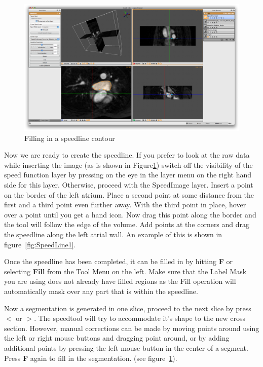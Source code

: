 \documentclass[fleqn,11pt,openany]{book}
\begin{document}
\begin{figure}
\includegraphics[width=\textwidth]{Seg3DTutorial_figures/SpeedlineFill.png}
\caption{Filling in a speedline contour}\label{fig:SpeedLine2}
\end{figure}

Now we are ready to create the speedline.  If you prefer to look at the raw data while inserting the image (as is shown in Figure\ref{fig:SpeedLine2}) switch off the visibility of the speed function layer by pressing on the eye in the layer menu on the right hand side for this layer.  Otherwise, proceed with the SpeedImage layer.  Insert a point on the border of the left atrium.  Place a second point at some distance from the first and a third point even further away. With the third point in place, hover over a point until you get a hand icon.  Now drag this point along the border and the tool will follow the edge of the volume. Add points at the corners and drag the speedline along the left atrial wall. An example of this is shown in figure~\ref{fig:SpeedLine1}. 

Once the speedline has been completed, it can be filled in by hitting {\bf F} or selecting {\bf Fill} from the Tool Menu on the left. Make sure that the Label Mask you are using does not already have filled regions as the Fill operation will automatically mask over any part that is within the speedline.

Now a segmentation is generated in one slice, proceed to the next slice by press {\bf $<$} or {\bf $>$}. The speedtool will try to accommodate it's shape to the new cross section. However, manual corrections can be made by moving points around using the left or right mouse buttons and dragging point around, or by adding additional points by pressing the left mouse button in the center of a segment. Press {\bf F} again to fill in the segmentation. (see figure~\ref{fig:SpeedLine2}).
\end{document}
